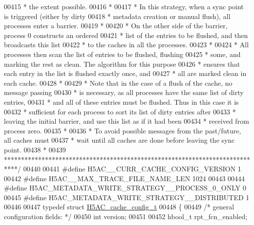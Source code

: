 \begin{DoxyCode}
00415 \textcolor{comment}{ *  the extent possible.}
00416 \textcolor{comment}{ *}
00417 \textcolor{comment}{ *  In this strategy, when a sync point is triggered (either by dirty}
00418 \textcolor{comment}{ *  metadata creation or manual flush), all processes enter a barrier.}
00419 \textcolor{comment}{ *}
00420 \textcolor{comment}{ *  On the other side of the barrier, process 0 constructs an ordered}
00421 \textcolor{comment}{ *  list of the entries to be flushed, and then broadcasts this list}
00422 \textcolor{comment}{ *  to the caches in all the processes.}
00423 \textcolor{comment}{ *}
00424 \textcolor{comment}{ *  All processes then scan the list of entries to be flushed, flushing}
00425 \textcolor{comment}{ *  some, and marking the rest as clean.  The algorithm for this purpose}
00426 \textcolor{comment}{ *  ensures that each entry in the list is flushed exactly once, and }
00427 \textcolor{comment}{ *  all are marked clean in each cache.}
00428 \textcolor{comment}{ *}
00429 \textcolor{comment}{ *  Note that in the case of a flush of the cache, no message passing}
00430 \textcolor{comment}{ *  is necessary, as all processes have the same list of dirty entries, }
00431 \textcolor{comment}{ *  and all of these entries must be flushed.  Thus in this case it is }
00432 \textcolor{comment}{ *  sufficient for each process to sort its list of dirty entries after }
00433 \textcolor{comment}{ *  leaving the initial barrier, and use this list as if it had been }
00434 \textcolor{comment}{ *  received from process zero.}
00435 \textcolor{comment}{ *}
00436 \textcolor{comment}{ *  To avoid possible messages from the past/future, all caches must}
00437 \textcolor{comment}{ *  wait until all caches are done before leaving the sync point.}
00438 \textcolor{comment}{ *      }
00439 \textcolor{comment}{ ****************************************************************************/}
00440 
00441 \textcolor{preprocessor}{#define H5AC\_\_CURR\_CACHE\_CONFIG\_VERSION     1}
00442 \textcolor{preprocessor}{#define H5AC\_\_MAX\_TRACE\_FILE\_NAME\_LEN       1024}
00443 
00444 \textcolor{preprocessor}{#define H5AC\_METADATA\_WRITE\_STRATEGY\_\_PROCESS\_0\_ONLY    0}
00445 \textcolor{preprocessor}{#define H5AC\_METADATA\_WRITE\_STRATEGY\_\_DISTRIBUTED       1}
00446 
00447 \textcolor{keyword}{typedef} \textcolor{keyword}{struct }\hyperlink{struct_h5_a_c__cache__config__t}{H5AC\_cache\_config\_t}
00448 \{
00449     \textcolor{comment}{/* general configuration fields: */}
00450     \textcolor{keywordtype}{int}                      version;
00451 
00452     hbool\_t          rpt\_fcn\_enabled;

\end{DoxyCode}
